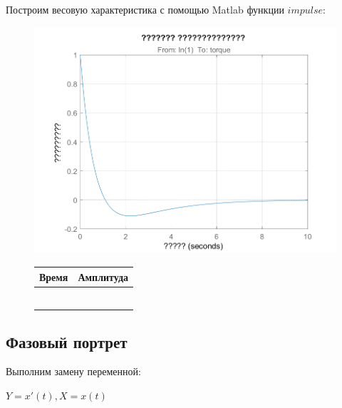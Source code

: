 \documentclass[14pt,a4paper,report]{report}
\begin{document}
Построим весовую характеристика с помощью Matlab функции $impulse$:\newline

\begin{figure}[htb]
	\begin{minipage}[c]{0.58\textwidth}
		\includegraphics[width=\textwidth]{images/impulse.png}
	\end{minipage}
	\centering
	\begin{minipage}[c]{0.38\textwidth}
		\centering
		\vspace{0pt}
		\begin{tabular}[b]{cc}\hline
			Время & Амплитуда \\ \hline
			&  \\
			&  \\
			&  \\
			&  \\
			&  \\
			&  \\ \hline
		\end{tabular}
	\end{minipage}
	\label{fig:sor-v}
\end{figure}


\subsection{Фазовый портрет}

Выполним замену переменной:

$Y=x'(t), X=x(t)$

\end{document}
